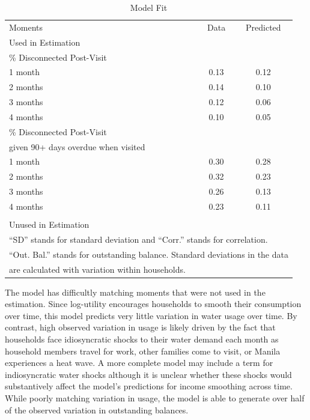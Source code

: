 \documentclass[12pt]{article}
\begin{document}
\begin{table}[H]
\centering
\caption{Model Fit}\label{table:fit}

\begin{tabular}{l*{1}{cc}}
\toprule
 Moments & Data  & Predicted \\[.5em]
Used in Estimation & & \\
\midrule
[.5em]
\% Disconnected Post-Visit  & & \\[.2em]
1 month &0.13&0.12\\
2 months &0.14&0.10\\
3 months  &0.12&0.06\\
4 months &0.10&0.05\\[.8em]
\% Disconnected Post-Visit & & \\
given 90+ days overdue when visited & & \\[.2em]
1 month &0.30&0.28\\
2 months &0.32&0.23\\
3 months &0.26&0.13\\
4 months &0.23&0.11\\
& & \\
Unused in Estimation & & \\
\midrule

\bottomrule
\multicolumn{3}{l}{\scriptsize ``SD'' stands for standard deviation and ``Corr.'' stands for correlation. }  \\[-.5em]
\multicolumn{3}{l}{\scriptsize ``Out. Bal.'' stands for outstanding balance. Standard deviations in the data }  \\[-.5em]
\multicolumn{3}{l}{\scriptsize are calculated with variation within households.}
\end{tabular}
%
\end{table}

The model has difficultly matching moments that were not used in the estimation.  Since log-utility encourages households to smooth their consumption over time, this model predicts very little variation in water usage over time.  By contrast, high observed variation in usage is likely driven by the fact that households face idiosyncratic shocks to their water demand each month as household members travel for work, other families come to visit, or Manila experiences a heat wave.  A more complete model may include a term for indiosyncratic water shocks although it is unclear whether these shocks would substantively affect the model's predictions for income smoothing across time.  While poorly matching variation in usage, the model is able to generate over half of the observed variation in outstanding balances.  
\end{document}
